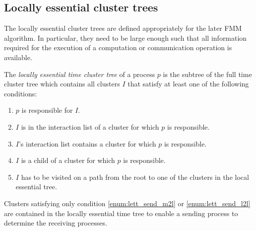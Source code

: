 \documentclass[a4paper,11pt]{article}
\theoremstyle{plain}
\theoremstyle{definition}
\theoremstyle{remark}
\begin{document}

\subsection{Locally essential cluster trees} \label{sec:loc_ess_cluster_tree}
The locally essential cluster trees are defined appropriately for the later FMM algorithm. In particular, they need to be large enough such that all information required for the execution of a computation or communication operation is available.

The \textit{locally essential time cluster tree} of a process $p$ is the subtree of the full time cluster tree which contains all clusters $I$ that satisfy at least one of the following conditions:
\begin{enumerate}
  \item $p$ is responsible for $I$. \label{enum:lett_responsible}
  \item $I$ is in the interaction list of a cluster for which $p$ is responsible. \label{enum:lett_recv_m2l}
  \item $I$'s interaction list contains a cluster for which $p$ is responsible. \label{enum:lett_send_m2l}
  \item $I$ is a child of a cluster for which $p$ is responsible. \label{enum:lett_send_l2l}
  \item $I$ has to be visited on a path from the root to one of the clusters in the local essential tree. 
  \label{enum:lett_path}
\end{enumerate}
Clusters satisfying only condition \ref{enum:lett_send_m2l} or \ref{enum:lett_send_l2l} are contained in the locally essential time tree to enable a sending process to determine the receiving processes.
\end{document}

